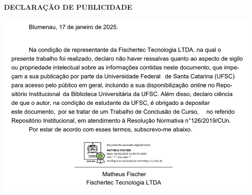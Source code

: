 
\begin{center}
	\textbf{DECLARAÇÃO DE PUBLICIDADE}
\end{center}

\begin{center}
	\includegraphics[scale=0.62]{beforetext/publicidade.png}
\end{center}







